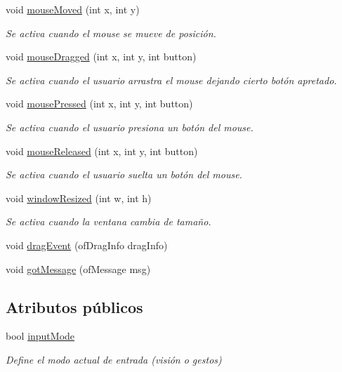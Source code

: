 \begin{DoxyCompactItemize}
void \hyperlink{classof_app_a158b41a606310db4633fdb817b21047c}{mouse\+Moved} (int x, int y)
\begin{DoxyCompactList}\small\item\em Se activa cuando el mouse se mueve de posición. \end{DoxyCompactList}\item 
void \hyperlink{classof_app_a1ec53d1be799dc275806ff6c6548cd83}{mouse\+Dragged} (int x, int y, int button)
\begin{DoxyCompactList}\small\item\em Se activa cuando el usuario arrastra el mouse dejando cierto botón apretado. \end{DoxyCompactList}\item 
void \hyperlink{classof_app_a2c2ea9c160231e55424dfd98466ef27d}{mouse\+Pressed} (int x, int y, int button)
\begin{DoxyCompactList}\small\item\em Se activa cuando el usuario presiona un botón del mouse. \end{DoxyCompactList}\item 
void \hyperlink{classof_app_aa3131f1554fc49eaa9ee0f284e48129b}{mouse\+Released} (int x, int y, int button)
\begin{DoxyCompactList}\small\item\em Se activa cuando el usuario suelta un botón del mouse. \end{DoxyCompactList}\item 
void \hyperlink{classof_app_ae4dc1ec1513dcbe48bc78a5e4c3fac0f}{window\+Resized} (int w, int h)
\begin{DoxyCompactList}\small\item\em Se activa cuando la ventana cambia de tamaño. \end{DoxyCompactList}\item 
void \hyperlink{classof_app_aada5a79556321801567752a0e5a69bda}{drag\+Event} (of\+Drag\+Info drag\+Info)
\item 
void \hyperlink{classof_app_a885672a72340a5e998af1d16718dc766}{got\+Message} (of\+Message msg)
\end{DoxyCompactItemize}
\subsection*{Atributos públicos}
\begin{DoxyCompactItemize}
\item 
bool \hyperlink{classof_app_ac06e7f62949f8d76a68ea3020ff21da3}{input\+Mode}
\begin{DoxyCompactList}\small\item\em Define el modo actual de entrada (visión o gestos) \end{DoxyCompactList}\end{DoxyCompactItemize}
